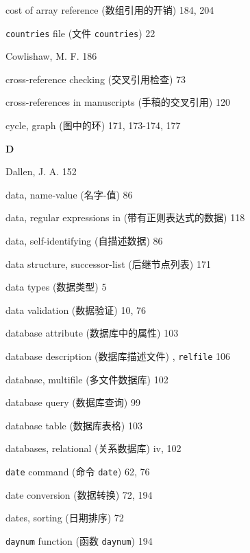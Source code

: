 \begin{multicols}{2}
\hangindent=2pc  cost of array reference (数组引用的开销) 184, 204

\hangindent=2pc  \verb'countries' file (文件 \verb'countries') 22

\hangindent=2pc  Cowlishaw, M. F. 186

\hangindent=2pc  cross-reference checking (交叉引用检查) 73

\hangindent=2pc  cross-references in manuscripts
(手稿的交叉引用) 120

\hangindent=2pc  cycle, graph (图中的环) 171, 173-174, 177

\medskip\textbf{\large{D}}

\hangindent=2pc  Dallen, J. A. 152

\hangindent=2pc  data, name-value (\mbox{名字}-值) 86

\hangindent=2pc  data, regular expressions in
(带有正则表达式的数据) 118

\hangindent=2pc  data, self-identifying (自描述数据) 86

\hangindent=2pc  data structure, successor-list (后继节点列表) 171

\hangindent=2pc  data types (数据类型) 5

\hangindent=2pc  data validation (数据验证) 10, 76

\hangindent=2pc  database attribute (数据库中的属性) 103

\hangindent=2pc  database description (数据库描述文件) ,
\verb'relfile' 106

\hangindent=2pc  database, multifile (多文件数据库) 102

\hangindent=2pc  database query (数据库查询) 99

\hangindent=2pc  database table (数据库表格) 103

\hangindent=2pc  databases, relational (关系数据库) iv, 102


\hangindent=2pc  \verb'date' command (命令 \verb'date') 62, 76

\hangindent=2pc  date conversion (数据转换) 72, 194

\hangindent=2pc  dates, sorting (日期排序) 72

\hangindent=2pc  \verb'daynum' function (函数 \verb'daynum') 194


\end{multicols}
